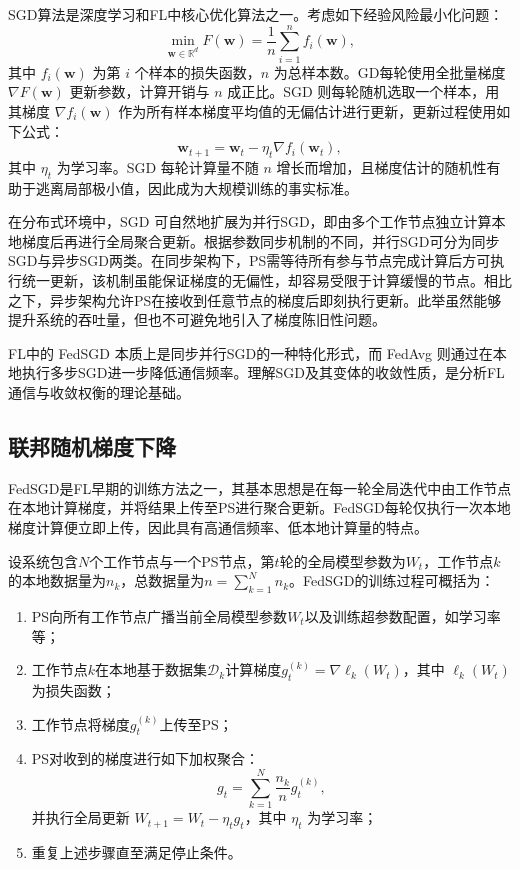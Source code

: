 \documentclass[master, vlined]{DissertUESTC}
\begin{document}
	SGD算法是深度学习和FL中核心优化算法之一。考虑如下经验风险最小化问题：
	\begin{equation}
	\min_{\mathbf{w} \in \mathbb{R}^d} F(\mathbf{w}) = \frac{1}{n}\sum_{i=1}^{n} f_i(\mathbf{w}),
	\end{equation}
	其中 $f_i(\mathbf{w})$ 为第 $i$ 个样本的损失函数，$n$ 为总样本数。GD每轮使用全批量梯度 $\nabla F(\mathbf{w})$ 更新参数，计算开销与 $n$ 成正比。SGD 则每轮随机选取一个样本，用其梯度 $\nabla f_i(\mathbf{w})$ 作为所有样本梯度平均值的无偏估计进行更新，更新过程使用如下公式：
	\begin{equation}
	\mathbf{w}_{t+1} = \mathbf{w}_t - \eta_t \nabla f_{i}(\mathbf{w}_t),
	\end{equation}
	其中 $\eta_t$ 为学习率。SGD 每轮计算量不随 $n$ 增长而增加，且梯度估计的随机性有助于逃离局部极小值，因此成为大规模训练的事实标准。

	在分布式环境中，SGD 可自然地扩展为并行SGD，即由多个工作节点独立计算本地梯度后再进行全局聚合更新。根据参数同步机制的不同，并行SGD可分为同步SGD与异步SGD两类。在同步架构下，PS需等待所有参与节点完成计算后方可执行统一更新，该机制虽能保证梯度的无偏性，却容易受限于计算缓慢的节点。相比之下，异步架构允许PS在接收到任意节点的梯度后即刻执行更新。此举虽然能够提升系统的吞吐量，但也不可避免地引入了梯度陈旧性问题。

	FL中的 FedSGD 本质上是同步并行SGD的一种特化形式，而 FedAvg 则通过在本地执行多步SGD进一步降低通信频率。理解SGD及其变体的收敛性质，是分析FL通信与收敛权衡的理论基础。

	\subsection{联邦随机梯度下降}

	FedSGD是FL早期的训练方法之一，其基本思想是在每一轮全局迭代中由工作节点在本地计算梯度，并将结果上传至PS进行聚合更新。FedSGD每轮仅执行一次本地梯度计算便立即上传，因此具有高通信频率、低本地计算量的特点。

	设系统包含$N$个工作节点与一个PS节点，第$t$轮的全局模型参数为$W_t$，工作节点$k$的本地数据量为$n_k$，总数据量为$n=\sum_{k=1}^{N}n_k$。FedSGD的训练过程可概括为：

	\begin{enumerate}
		\item PS向所有工作节点广播当前全局模型参数$W_t$以及训练超参数配置，如学习率等；
		\item 工作节点$k$在本地基于数据集$\mathcal{D}_k$计算梯度$g_t^{(k)}=\nabla \ell_k(W_t)$，其中 $\ell_k(W_t)$ 为损失函数；
		\item 工作节点将梯度$g_t^{(k)}$上传至PS；
		\item PS对收到的梯度进行如下加权聚合：
		\begin{equation}
			g_t = \sum_{k=1}^{N} \frac{n_k}{n} g_t^{(k)},
		\end{equation}
		并执行全局更新 $W_{t+1} = W_t - \eta_t g_t$，其中 $\eta_t$ 为学习率；
		\item 重复上述步骤直至满足停止条件。
	\end{enumerate}
\end{document}
